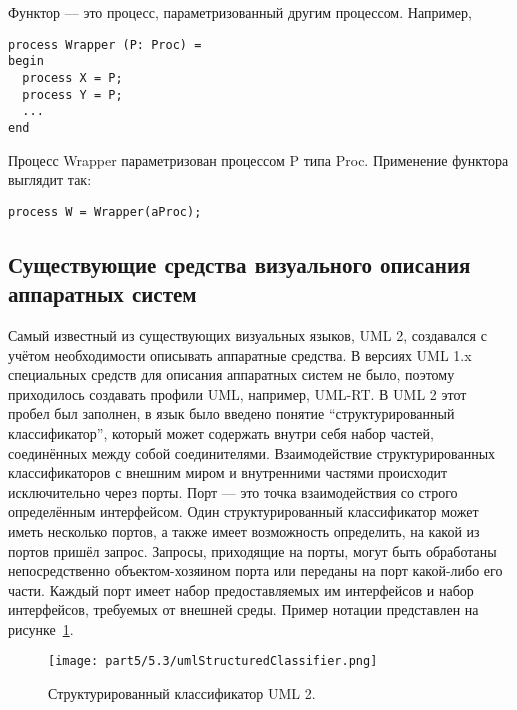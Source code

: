 Функтор --- это процесс, параметризованный другим процессом. Например,

\vspace{5mm}
\begin{minipage}{\linewidth}
\begin{verbatim}
process Wrapper (P: Proc) =
begin
  process X = P;
  process Y = P;
  ...
end
\end{verbatim}
\end{minipage}
\vspace{5mm}

Процесс Wrapper параметризован процессом P типа Proc. Применение функтора выглядит так:
\begin{verbatim}
process W = Wrapper(aProc);
\end{verbatim}

\subsection{Существующие средства визуального описания аппаратных систем}
Самый известный из существующих визуальных языков, UML 2, создавался с учётом необходимости 
описывать аппаратные средства. В версиях UML 1.x специальных средств для описания 
аппаратных систем не было, поэтому приходилось создавать профили UML, например, UML-RT.
В UML 2 этот пробел был заполнен, в язык было введено понятие "`структурированный классификатор"', 
который может содержать внутри себя набор частей, соединённых между собой соединителями. 
Взаимодействие структурированных классификаторов с внешним миром и внутренними частями 
происходит исключительно через порты. Порт --- это точка взаимодействия со строго 
определённым интерфейсом. Один структурированный классификатор может иметь несколько 
портов, а также имеет возможность определить, на какой из портов пришёл запрос. Запросы, 
приходящие на порты, могут быть обработаны непосредственно объектом-хозяином порта 
или переданы на порт какой-либо его части. Каждый порт имеет набор предоставляемых 
им интерфейсов и набор интерфейсов, требуемых от внешней среды. Пример нотации представлен 
на рисунке~\ref{image:umlStructuredClassifier}.

\begin{figure} [ht]
	\begin{center}
		\texttt{[image: part5/5.3/umlStructuredClassifier.png]}
		\caption{Структурированный классификатор UML 2.}
		\label{image:umlStructuredClassifier}
	\end{center}
\end{figure}

